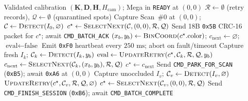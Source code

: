 \documentclass[10pt,twocolumn,letterpaper]{article}
\begin{document}
\begin{algorithm}[t]
\caption{CapSorter Closed-Loop Pipelined Bin-Side Sorting}
\label{alg:closed_loop}
\small
\begin{algorithmic}[1]
\REQUIRE Validated calibration $(\mathbf{K},\mathbf{D},\mathbf{H},H_{\mathrm{cam}})$; Mega in \texttt{READY} at $(0,0)$
\STATE $\mathcal{R} \leftarrow \emptyset$ (retry records), $\mathcal{Q} \leftarrow \emptyset$ (quarantined spots)
\STATE Capture Scan~\#0 at $(0,0)$; $\mathcal{C} \leftarrow \textsc{Detect}(I_0, \varnothing)$
\STATE $c^\star \leftarrow \textsc{SelectNext}(\mathcal{C}, (0,0), \mathcal{R}, \mathcal{Q})$
  \STATE Send 18B \texttt{0x5B} CRC-16 packet for $c^\star$; await \texttt{CMD\_BATCH\_ACK}
  \STATE $(x_b, y_b) \leftarrow \textsc{BinCoord}(c^\star.\text{color})$; $c_{\mathrm{next}} \leftarrow \varnothing$; $\text{eval} \leftarrow \text{false}$
    \STATE Emit \texttt{0xF0} heartbeat every $250\text{ ms}$; abort on fault/timeout
      \STATE {}
      \STATE Capture fresh $I_k$; $\mathcal{C}_k \leftarrow \textsc{Detect}(I_k, y_b)$
      \STATE $\text{eval} \leftarrow \textsc{UpdateRetry}(c^\star, \mathcal{C}_k, \mathcal{R}, \mathcal{Q}, y_b)$
      \STATE $c_{\mathrm{next}} \leftarrow \textsc{SelectNext}(\mathcal{C}_k, (x_b, y_b), \mathcal{R}, \mathcal{Q})$
    \ENDIF
  \ENDWHILE
    \STATE $c^\star \leftarrow c_{\mathrm{next}}$ 
  \ELSE
    \STATE Send \texttt{CMD\_PARK\_FOR\_SCAN} (\texttt{0xB5}); await \texttt{0xA6} at $(0,0)$
    \STATE Capture unoccluded $I_v$; $\mathcal{C}_v \leftarrow \textsc{Detect}(I_v, \varnothing)$
      \STATE $\textsc{UpdateRetry}(c^\star, \mathcal{C}_v, \mathcal{R}, \mathcal{Q}, \varnothing)$
    \ENDIF
    \STATE $c^\star \leftarrow \textsc{SelectNext}(\mathcal{C}_v, (0,0), \mathcal{R}, \mathcal{Q})$
  \ENDIF
\ENDWHILE
\STATE Send \texttt{CMD\_FINISH\_SESSION} (\texttt{0xB6}); await \texttt{CMD\_BATCH\_COMPLETE}
\end{algorithmic}
\end{algorithm}
\end{document}
